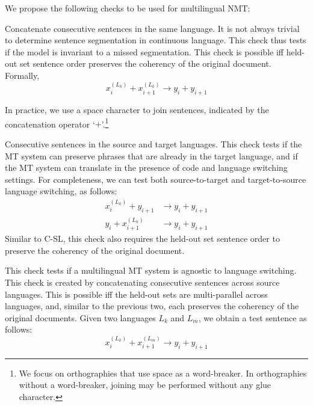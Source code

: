 We propose the following checks to be used for multilingual NMT:
\begin{description}[itemsep=-2mm,topsep=0mm,leftmargin=3mm]
    
    \item[C-SL:] Concatenate consecutive sentences in the same language. 
    It is not always trivial to determine sentence segmentation in continuous language. This check thus tests if the model is invariant to a missed segmentation. 
    This check is possible iff held-out set sentence order preserves the coherency of the original document. 
    Formally, $$x^{(L_k)}_{i} + x^{(L_k)}_{i+1} \rightarrow y_i + y_{i+1}$$
    
    In practice, we use a space character to join sentences, indicated by the concatenation operator `$+$'.\footnote{We focus on orthographies that use space as a word-breaker.
    In orthographies without a word-breaker, joining may be performed without any glue character.}
    \item[C-TL:] Consecutive sentences in the source and target languages.
    This check tests if the MT system can preserve phrases that are already in the target language, and if the MT system can translate in the presence of code and language switching settings. For completeness, we can test both source-to-target and target-to-source language switching, as follows:
    \begin{align*}
       x^{(L_k)}_i + y_{i+1} & \rightarrow y_i + y_{i+1} \\
       y_{i} + x^{(L_k)}_{i+1} & \rightarrow y_{i} + y_{i+1}
    \end{align*}
Similar to C-SL, this check also requires the held-out set sentence order to preserve the coherency of the original document.
    
    \item[C-XL:] This check tests if a multilingual MT system is agnostic to language switching. 
    This check is created by concatenating consecutive sentences across source languages. 
    This is possible iff the held-out sets are multi-parallel across languages, and, similar to the previous two, each preserves the coherency of the original documents.
    Given two languages $L_k$ and $L_m$, we obtain a test sentence as follows: 
    $$x^{(L_k)}_i + x^{(L_m)}_{i+1} \rightarrow y_i + y_{i+1}$$
    

\end{description}
